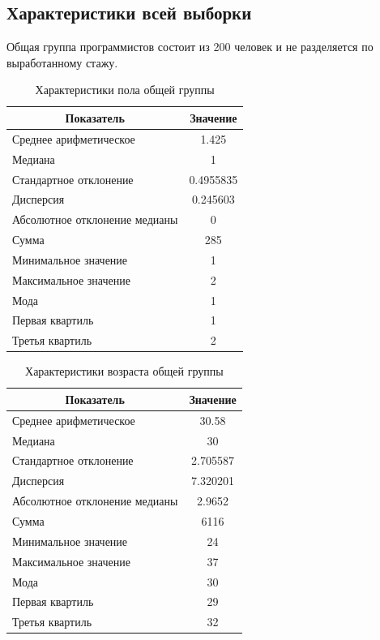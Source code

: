 \subsection{Характеристики всей выборки}
Общая группа программистов состоит из 200 человек и не разделяется по выработанному стажу.

\begin{table}[H]
	\centering
	\caption{Характеристики пола общей группы}
	\begin{tabular}{|l|c|}
		\hline
		\multicolumn{1}{|c|}{\textbf{Показатель}} & \textbf{Значение}\\ \hline
		Среднее арифметическое        & 1.425     \\ \hline
		Медиана                       & 1         \\ \hline
		Стандартное отклонение        & 0.4955835 \\ \hline
		Дисперсия                      & 0.245603  \\ \hline
		Абсолютное отклонение медианы & 0         \\ \hline
		Сумма                         & 285       \\ \hline
		Минимальное значение          & 1         \\ \hline
		Максимальное значение         & 2         \\ \hline
		Мода & 1 \\ \hline
		Первая квартиль & 1 \\ \hline
		Третья квартиль & 2 \\ \hline
	\end{tabular}
\end{table}


\begin{table}[H]
	\centering
	\caption{Характеристики возраста общей группы}
	\begin{tabular}{|l|c|}
		\hline
		\multicolumn{1}{|c|}{\textbf{Показатель}} & \textbf{Значение}\\ \hline
		Среднее арифметическое        & 30.58    \\ \hline
		Медиана                       & 30       \\ \hline
		Стандартное отклонение        & 2.705587 \\ \hline
		Дисперсия                      & 7.320201 \\ \hline
		Абсолютное отклонение медианы & 2.9652   \\ \hline
		Сумма                         & 6116     \\ \hline
		Минимальное значение          & 24       \\ \hline
		Максимальное значение         & 37       \\ \hline
		Мода & 30 \\ \hline
		Первая квартиль & 29 \\ \hline
		Третья квартиль & 32 \\ \hline
	\end{tabular}
\end{table}


